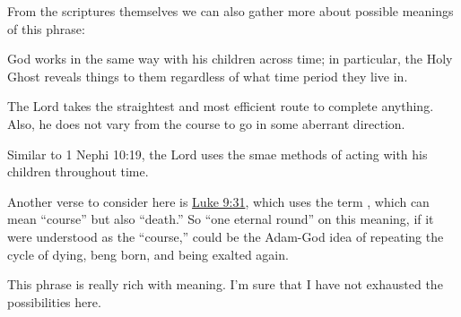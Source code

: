 \begin{compactdesc}
\begin{compactdesc}
					From the scriptures themselves we can also gather more about possible meanings of this phrase:
						\begin{compactitem}
							\item[1 Nephi 10:19] God works in the same way with his children across time; in particular, the Holy Ghost reveals things to them regardless of what time period they live in.
							\item[Alma 7:20, Alma 37:12, DC 3:2] The Lord takes the straightest and most efficient route to complete anything. Also, he does not vary from the course to go in some aberrant direction.
							\item[DC 35:1] Similar to 1 Nephi 10:19, the Lord uses the smae methods of acting with his children throughout time.
						\end{compactitem}
						
					Another verse to consider here is \hyperref[LUKE-9-31]{Luke 9:31}, which uses the term , which can mean ``course'' but also ``death.'' So ``one eternal round'' on this meaning, if it were understood as the ``course,'' could be the Adam-God idea of repeating the cycle of dying, beng born, and being exalted again.
					
					This phrase is really rich with meaning. I'm sure that I have not exhausted the possibilities here.
			\end{compactdesc}
			
	\end{compactdesc}
	


	
	
